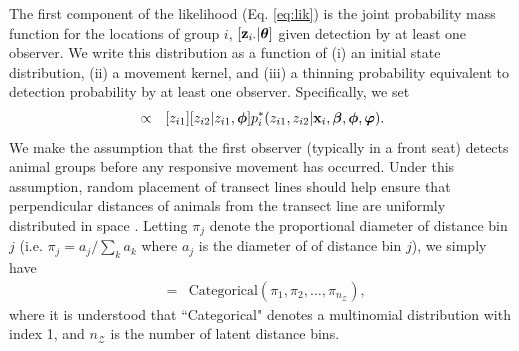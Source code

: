 \documentclass[12pt,fleqn]{article}
\begin{document}
The first component of the likelihood (Eq. \ref{eq:lik}) is the joint probability mass function for the locations of group $i$, $[{\bf z}_{i \cdot} |\boldsymbol{\theta}]$ given detection by at least one observer.  We write this distribution as a function of (i) an initial state distribution, (ii) a movement kernel, and (iii) a thinning probability equivalent to detection probability by at least one observer.  Specifically, we set
\begin{eqnarray}
[{\bf z}_{i \cdot} |\boldsymbol{\theta}] & \propto & [z_{i1}][z_{i2}|z_{i1},\boldsymbol{\phi}]p_i^*(z_{i1},z_{i2}|{\bf x}_i,\boldsymbol{\beta},\boldsymbol{\phi},\boldsymbol{\varphi}).
\end{eqnarray}
We make the assumption that the first observer (typically in a front seat) detects animal groups before any responsive movement has occurred.  Under this assumption, random placement of transect lines should help ensure that perpendicular distances of animals from the transect line are uniformly distributed in space \citep[cf.][]{BucklandEtAl2001}.  Letting $\pi_j$ denote the proportional diameter of distance bin $j$ (i.e. $\pi_j = a_j / \sum_k a_k$ where $a_j$ is the diameter of of distance bin $j$), we simply have
\begin{eqnarray*}
  [z_{i1}] & = & \text{Categorical}(\pi_1,\pi_2,\hdots,\pi_{n_{\mathcal{Z}}}),
\end{eqnarray*}
where it is understood that ``Categorical" denotes a multinomial distribution with index 1, and $n_{\mathcal{Z}}$ is the number of latent distance bins.
\end{document}
